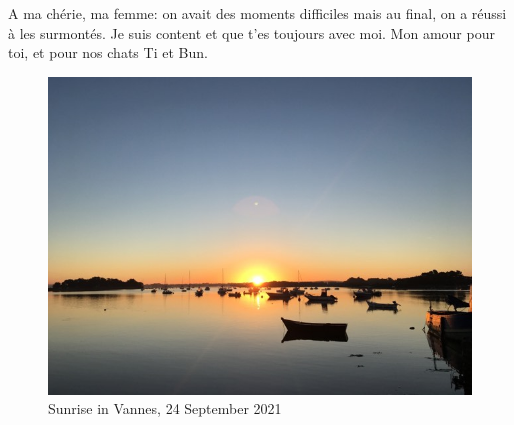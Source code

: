 A ma chérie, ma femme: on avait des moments difficiles mais au final,
on a réussi à les surmontés.
Je suis content et que t'es toujours avec moi. Mon amour pour toi,
et pour nos chats Ti et Bun.

\begin{figure}[t]
    \centering
    \includegraphics[width=0.7\linewidth]{./Chapitre0/sunrise_vannes.jpg}
    \caption*{Sunrise in Vannes, 24 September 2021}
\end{figure}
